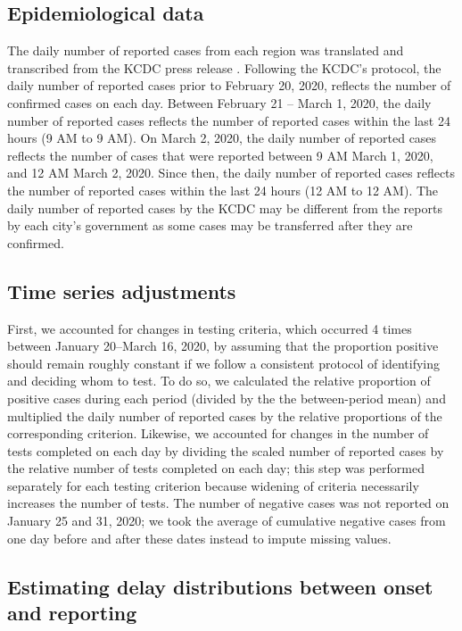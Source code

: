 \documentclass[12pt]{article}
\begin{document}
\subsection*{Epidemiological data}

The daily number of reported cases from each region was translated and transcribed from the KCDC press release \citep{kcdc}.
Following the KCDC's protocol, the daily number of reported cases prior to February 20, 2020, reflects the number of confirmed cases on each day.
Between February 21 -- March 1, 2020, the daily number of reported cases reflects the number of reported cases within the last 24 hours (9 AM to 9 AM).
On March 2, 2020, the daily number of reported cases reflects the number of cases that were reported between 9 AM March 1, 2020, and 12 AM March 2, 2020.
Since then, the daily number of reported cases reflects the number of reported cases within the last 24 hours (12 AM to 12 AM).
The daily number of reported cases by the KCDC may be different from the reports by each city's government as some cases may be transferred after they are confirmed.

\subsection*{Time series adjustments}

First, we accounted for changes in testing criteria, which occurred 4 times between January 20--March 16, 2020, by assuming that the proportion positive should remain roughly constant if we follow a consistent protocol of identifying and deciding whom to test.
To do so, we calculated the relative proportion of positive cases during each period (divided by the the between-period mean) and multiplied the daily number of reported cases by the relative proportions of the corresponding criterion.
Likewise, we accounted for changes in the number of tests completed on each day by dividing the scaled number of reported cases by the relative number of tests completed on each day; this step was performed separately for each testing criterion because widening of criteria necessarily increases the number of tests.
The number of negative cases was not reported on January 25 and 31, 2020; we took the average of cumulative negative cases from one day before and after these dates instead to impute missing values.

\subsection*{Estimating delay distributions between onset and reporting}
\end{document}

